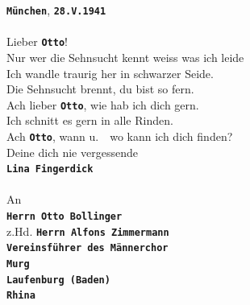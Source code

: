 \documentclass[12pt, a4paper, ngerman, bidi=default]{article}
\begin{document}
\begingroup
\begin{figure}[htbp]
\begin{tcolorbox}[colback=oldLetter, colframe=black, sharp corners, width=\textwidth]
\textbf{\colorbox{place}{\texttt{München}}}, \textbf{\colorbox{date}{\texttt{28.V.1941}}} \\
\\
Lieber \textbf{\colorbox{person}{\texttt{Otto}}}!\\
Nur wer die Sehnsucht kennt weiss was ich leide\\
Ich wandle traurig her in schwarzer Seide.\\
Die Sehnsucht brennt, du bist so fern.\\
Ach lieber \textbf{\colorbox{person}{\texttt{Otto}}}, wie hab ich dich gern.\\
Ich schnitt es gern in alle Rinden.\\
Ach \textbf{\colorbox{person}{\texttt{Otto}}}, wann u.\ \ wo kann ich dich finden?\\
Deine dich nie vergessende\\
\textbf{\colorbox{person}{\texttt{Lina Fingerdick}}}\\
\\
An\\
\textbf{\colorbox{person}{\texttt{Herrn Otto Bollinger}}}\\
z.Hd. \textbf{\colorbox{person}{\texttt{Herrn Alfons Zimmermann}}}\\
\textbf{\colorbox{organization}{\texttt{Vereinsführer des Männerchor}}}\\
\textbf{\colorbox{place}{\texttt{Murg}}}\\
\textbf{\colorbox{place}{\texttt{Laufenburg (Baden)}}}\\
\textbf{\colorbox{place}{\texttt{Rhina}}}
\end{tcolorbox}
\end{figure}
\endgroup

\pagecolor{white}
\newpage
\begingroup
\small
\singlespacing%
\printbibliography[
heading=bibintoc,
title={Bibliographie}%
]
\endgroup
\end{document}
